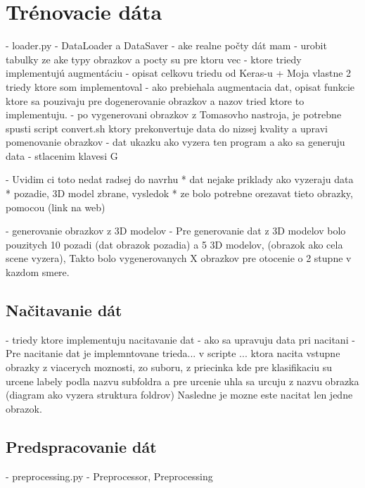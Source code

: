 
\section{Trénovacie dáta}
\label{sec:trenovaciedata}
- loader.py - DataLoader a DataSaver
- ake realne počty dát mam
- urobit tabulky ze ake typy obrazkov a pocty su pre ktoru vec
- ktore triedy implementujú augmentáciu
- opisat celkovu triedu od Keras-u + Moja vlastne 2 triedy ktore som implementoval
- ako prebiehala augmentacia dat, opisat funkcie ktore sa pouzivaju pre dogenerovanie obrazkov a nazov tried ktore to implementuju.
- po vygenerovani obrazkov z Tomasovho nastroja, je potrebne spusti script convert.sh ktory prekonvertuje data do nizsej kvality
  a upravi pomenovanie obrazkov
- dat ukazku ako vyzera ten program a ako sa generuju data - stlacenim klavesi G

- Uvidim ci toto nedat radsej do navrhu
    * dat nejake priklady ako vyzeraju data
    * pozadie, 3D model zbrane, vysledok
    * ze bolo potrebne orezavat tieto obrazky, pomocou (link na web)

- generovanie obrazkov z 3D modelov
    - Pre generovanie dat z 3D modelov bolo pouzitych 10 pozadi (dat obrazok pozadia) a 5 3D modelov, (obrazok ako cela scene vyzera),
      Takto bolo vygenerovanych X obrazkov pre otocenie o 2 stupne v kazdom smere.

\subsection{Načitavanie dát}
\label{subsec:nacitaniedat}
- triedy ktore implementuju nacitavanie dat
- ako sa upravuju data pri nacitani
- Pre nacitanie dat je implemntovane trieda... v scripte ... ktora nacita vstupne obrazky z viacerych moznosti, zo suboru,
  z priecinka kde pre klasifikaciu su urcene labely podla nazvu subfoldra a pre urcenie uhla sa urcuju z nazvu obrazka (diagram ako vyzera struktura foldrov)
  Nasledne je mozne este nacitat len jedne obrazok.

\subsection{Predspracovanie dát}
\label{subsec:predspracovaniedat}
- preprocessing.py - Preprocessor, Preprocessing
